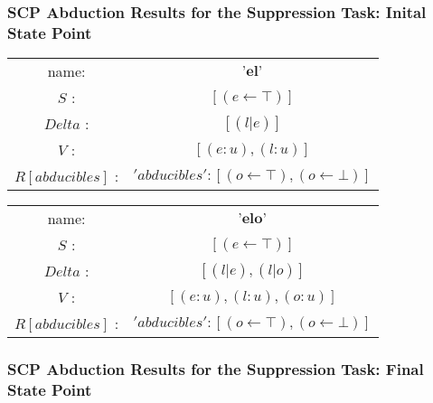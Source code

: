 \subsubsection*{SCP Abduction Results for the Suppression Task: Inital State Point}





\begin{table}[!htbp]
\begin{center}
\begin{tabular}{| c | c | }
\hline
name: &$\textbf{'el'}$ \\
$S$ : & $[(e \leftarrow  \top )]$\\
$Delta$ : & $[(l | e)]$\\
$V$ : & $[(e:u), (l:u)]$\\
$R[abducibles]$ : & ${'abducibles': [(o \leftarrow  \top ), (o \leftarrow  \bot )]}$\\
\hline
\end{tabular}
\end{center}
\end{table}
\begin{table}[!htbp]
\begin{center}
\begin{tabular}{| c | c | }
\hline
name: &$\textbf{'elo'}$ \\
$S$ : & $[(e \leftarrow  \top )]$\\
$Delta$ : & $[(l | e), (l | o)]$\\
$V$ : & $[(e:u), (l:u), (o:u)]$\\
$R[abducibles]$ : & ${'abducibles': [(o \leftarrow  \top ), (o \leftarrow  \bot )]}$\\
\hline
\end{tabular}
\end{center}
\end{table}

\subsubsection*{SCP Abduction Results for the Suppression Task: Final State Point}

